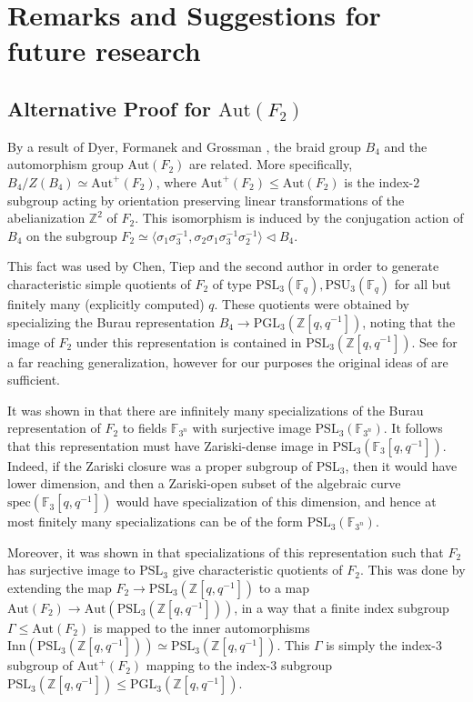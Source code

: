 \documentclass[letterpaper]{amsart}
\begin{document}
\section{Remarks and Suggestions for future research}
\label{Final section}
\subsection{Alternative Proof for $\mathrm{Aut}(F_2)$}
By a result of Dyer, Formanek and Grossman \cite{dyer1982linearity}, the braid group $B_4$ and the automorphism group $\mathrm{Aut}(F_2)$ are related. More specifically, $B_4 / Z(B_4) \simeq \mathrm{Aut}^+(F_2)$, where $\mathrm{Aut}^+(F_2) \leq \mathrm{Aut}(F_2)$ is the index-$2$ subgroup acting by orientation preserving linear transformations of the abelianization $\mathbb{Z}^2$ of $F_2$. This isomorphism is induced by the conjugation action of $B_4$ on the subgroup $F_2 \simeq \langle \sigma_1\sigma_3^{-1}, \sigma_2\sigma_1\sigma_3^{-1}\sigma_2^{-1} \rangle \lhd B_4$.

This fact was used by Chen, Tiep and the second author \cite{chen2025finite} in order to generate characteristic simple quotients of $F_2$ of type $\mathrm{PSL}_3(\mathbb{F}_q), \mathrm{PSU}_3(\mathbb{F}_q)$ for all but finitely many (explicitly computed) $q$. These quotients were obtained by specializing the Burau representation $B_4 \to \mathrm{PGL}_3(\mathbb{Z}[q, q^{-1}])$, noting that the image of $F_2$ under this representation is contained in $\mathrm{PSL}_3(\mathbb{Z}[q, q^{-1}]).$ See \cite{hanany2025} for a far reaching generalization, however for our purposes the original ideas of \cite{chen2025finite} are sufficient.

It was shown in \cite{chen2025finite} that there are infinitely many specializations of the Burau representation of $F_2$ to fields $\mathbb{F}_{3^n}$ with surjective image $\mathrm{PSL}_3(\mathbb{F}_{3^n})$. It follows that this representation must have Zariski-dense image in $\mathrm{PSL}_3(\mathbb{F}_3[q, q^{-1}])$. Indeed, if the Zariski closure was a proper subgroup of $\mathrm{PSL}_3$, then it would have lower dimension, and then a Zariski-open subset of the algebraic curve $\mathrm{spec}(\mathbb{F}_3[q, q^{-1}])$ would have specialization of this dimension, and hence at most finitely many specializations can be of the form $\mathrm{PSL}_3(\mathbb{F}_{3^n})$.

Moreover, it was shown in \cite[Proposition 2.8]{chen2025finite} that specializations of this representation such that $F_2$ has surjective image to $\mathrm{PSL}_3$ give characteristic quotients of $F_2$. This was done by extending the map $F_2 \to \mathrm{PSL}_3(\mathbb{Z}[q, q^{-1}])$ to a map $\mathrm{Aut}(F_2) \to \mathrm{Aut}(\mathrm{PSL}_3(\mathbb{Z}[q, q^{-1}]))$, in a way that a finite index subgroup $\Gamma \leq \mathrm{Aut}(F_2)$ is mapped to the inner automorphisms $\mathrm{Inn}(\mathrm{PSL}_3(\mathbb{Z}[q, q^{-1}])) \simeq \mathrm{PSL}_3(\mathbb{Z}[q, q^{-1}])$. This $\Gamma$ is simply the index-$3$ subgroup of $\mathrm{Aut}^+(F_2)$ mapping to the index-$3$ subgroup $\mathrm{PSL}_3(\mathbb{Z}[q, q^{-1}]) \leq \mathrm{PGL}_3(\mathbb{Z}[q, q^{-1}]).$
\end{document}

